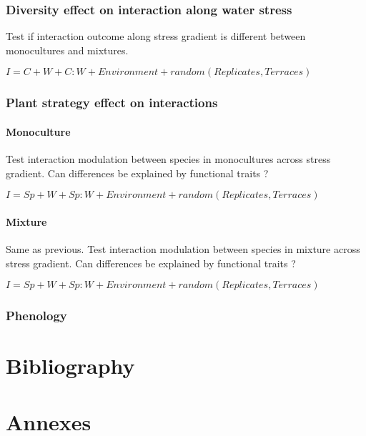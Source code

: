 \documentclass[12pt, a4paper]{article} %
\begin{document}
\subsubsection{Diversity effect on interaction along water stress}
Test if interaction outcome along stress gradient is different between monocultures and mixtures.

$I= C + W + C:W + Environment + random(Replicates,Terraces)$

\subsubsection{Plant strategy effect on interactions}

\paragraph{Monoculture}
Test interaction modulation between species in monocultures across stress gradient. Can differences be explained by functional traits ?

$I= Sp + W + Sp:W + Environment + random(Replicates,Terraces)$

\paragraph{Mixture}
Same as previous. Test interaction modulation between species in mixture across stress gradient. Can differences be explained by functional traits ?

$I= Sp + W + Sp:W + Environment + random(Replicates,Terraces)$

\subsubsection{Phenology}

\section{Bibliography}



\begin{spacing}{1.0}

\end{spacing}

\section{Annexes}

\
\end{document}
